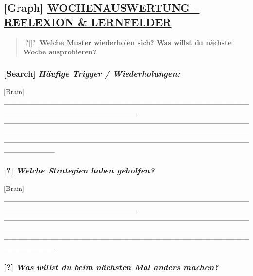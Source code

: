 \hypertarget{wochenauswertung-reflexion-lernfelder}{%
\subsection{\texorpdfstring{[Graph] \textbf{\ul{WOCHENAUSWERTUNG -- REFLEXION \& LERNFELDER}}}{[Graph] WOCHENAUSWERTUNG -- REFLEXION \& LERNFELDER}}\label{wochenauswertung-reflexion-lernfelder}}

\begin{quote}
[?][?] \textbf{Welche Muster wiederholen sich? Was willst du nächste Woche ausprobieren?}
\end{quote}

\hypertarget{huxe4ufige-trigger-wiederholungen}{%
\subsubsection{\texorpdfstring{[Search] \emph{\textbf{Häufige Trigger / Wiederholungen:}}}{[Search] Häufige Trigger / Wiederholungen:}}\label{huxe4ufige-trigger-wiederholungen}}

[Brain] \_\_\_\_\_\_\_\_\_\_\_\_\_\_\_\_\_\_\_\_\_\_\_\_\_\_\_\_\_\_\_\_\_\_\_\_\_\_\_\_\_\_\_\_\_\_\_\_\_\_\_\_\_\_\_\_\_\_\_\_\_\_\_\_\_\_\_\_\_\_\_\_\_\_ \_\_\_\_\_\_\_\_\_\_\_\_\_\_\_\_\_\_\_\_\_\_\_\_\_\_\_\_\_\_\_\_\_\_\_\_\_\_\_\_\_\_\_\_\_\_\_\_\_\_\_\_\_\_\_\_\_\_\_\_\_\_\_\_\_\_\_\_\_\_\_\_\_\_\_\_\_\_\_\_\_\_\_\_\_\_\_\_\_\_\_\_\_\_\_\_\_\_\_\_\_\_\_\_\_\_\_\_\_\_\_\_\_\_\_\_\_\_\_\_\_\_\_\_\_\_\_\_\_\_\_\_\_\_\_\_\_\_\_\_\_\_\_\_\_\_\_\_\_\_\_\_\_\_

\hypertarget{welche-strategien-haben-geholfen}{%
\subsubsection{\texorpdfstring{[?] \emph{\textbf{Welche Strategien haben geholfen?}}}{[?] Welche Strategien haben geholfen?}}\label{welche-strategien-haben-geholfen}}

[Brain] \_\_\_\_\_\_\_\_\_\_\_\_\_\_\_\_\_\_\_\_\_\_\_\_\_\_\_\_\_\_\_\_\_\_\_\_\_\_\_\_\_\_\_\_\_\_\_\_\_\_\_\_\_\_\_\_\_\_\_\_\_\_\_\_\_\_\_\_\_\_\_\_\_\_ \_\_\_\_\_\_\_\_\_\_\_\_\_\_\_\_\_\_\_\_\_\_\_\_\_\_\_\_\_\_\_\_\_\_\_\_\_\_\_\_\_\_\_\_\_\_\_\_\_\_\_\_\_\_\_\_\_\_\_\_\_\_\_\_\_\_\_\_\_\_\_\_\_\_\_\_\_\_\_\_\_\_\_\_\_\_\_\_\_\_\_\_\_\_\_\_\_\_\_\_\_\_\_\_\_\_\_\_\_\_\_\_\_\_\_\_\_\_\_\_\_\_\_\_\_\_\_\_\_\_\_\_\_\_\_\_\_\_\_\_\_\_\_\_\_\_\_\_\_\_\_\_\_\_

\hypertarget{was-willst-du-beim-nuxe4chsten-mal-anders-machen}{%
\subsubsection{\texorpdfstring{[?] \emph{\textbf{Was willst du beim nächsten Mal anders machen?}}}{[?] Was willst du beim nächsten Mal anders machen?}}\label{was-willst-du-beim-nuxe4chsten-mal-anders-machen}}

